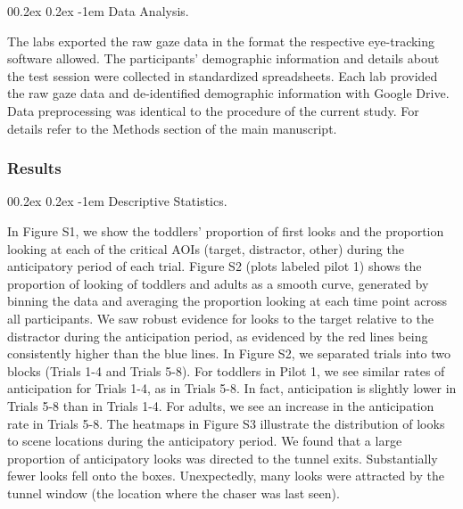 \documentclass[
  english,
  man, donotrepeattitle,floatsintext]{apa6}
\makeatletter
\let\oldparagraph\paragraph
\renewcommand{\paragraph}[1]{\oldparagraph{#1}\mbox{}}
\renewcommand{\paragraph}{\@startsection{paragraph}{4}{\parindent}%
  {0\baselineskip \@plus 0.2ex \@minus 0.2ex}%
  {-1em}%
  {\normalfont\normalsize\bfseries\itshape\typesectitle}}
\makeatother
\begin{document}
\hypertarget{data-analysis.}{%
\paragraph{Data Analysis.}\label{data-analysis.}}

The labs exported the raw gaze data in the format the respective eye-tracking software allowed. The participants' demographic information and details about the test session were collected in standardized spreadsheets. Each lab provided the raw gaze data and de-identified demographic information with Google Drive. Data preprocessing was identical to the procedure of the current study. For details refer to the Methods section of the main manuscript.

\hypertarget{results}{%
\subsubsection{Results}\label{results}}

\hypertarget{descriptive-statistics.}{%
\paragraph{Descriptive Statistics.}\label{descriptive-statistics.}}

In Figure S1, we show the toddlers' proportion of first looks and the proportion looking at each of the critical AOIs (target, distractor, other) during the anticipatory period of each trial. Figure S2 (plots labeled pilot 1) shows the proportion of looking of toddlers and adults as a smooth curve, generated by binning the data and averaging the proportion looking at each time point across all participants. We saw robust evidence for looks to the target relative to the distractor during the anticipation period, as evidenced by the red lines being consistently higher than the blue lines. In Figure S2, we separated trials into two blocks (Trials 1-4 and Trials 5-8). For toddlers in Pilot 1, we see similar rates of anticipation for Trials 1-4, as in Trials 5-8. In fact, anticipation is slightly lower in Trials 5-8 than in Trials 1-4. For adults, we see an increase in the anticipation rate in Trials 5-8.
The heatmaps in Figure S3 illustrate the distribution of looks to scene locations during the anticipatory period. We found that a large proportion of anticipatory looks was directed to the tunnel exits. Substantially fewer looks fell onto the boxes. Unexpectedly, many looks were attracted by the tunnel window (the location where the chaser was last seen).
\end{document}

